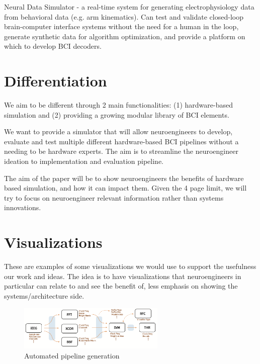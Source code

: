 \documentclass[twocolumn]{article}
\begin{document}
Neural Data Simulator \cite{neural-sim-github} - a real-time system for generating electrophysiology data from behavioral data (e.g. arm kinematics). Can test and validate closed-loop brain-computer interface systems without the need for a human in the loop, generate synthetic data for algorithm optimization, and provide a platform on which to develop BCI decoders.

\section{Differentiation}

We aim to be different through 2 main functionalities: (1) hardware-based simulation and (2) providing a growing modular library of BCI elements.

We want to provide a simulator that will allow neuroengineers to develop, evaluate and test multiple different hardware-based BCI pipelines without a needing to be hardware experts. The aim is to streamline the neuroengineer ideation to implementation and evaluation pipeline.

The aim of the paper will be to show neuroengineers the benefits of hardware based simulation, and how it can impact them. Given the 4 page limit, we will try to focus on neuroengineer relevant information rather than systems innovations.


\section{Visualizations}

These are examples of some visualizations we would use to support the usefulness our work and ideas. The idea is to have visualizations that neuroengineers in particular can relate to and see the benefit of, less emphasis on showing the systems/architecture side.

\begin{figure}[htp]
    \centering
    \includegraphics[width=7cm]{vis/computation_graph.png}
    \caption{Automated pipeline generation}
    \label{fig:comp_graph}
\end{figure}
\end{document}
